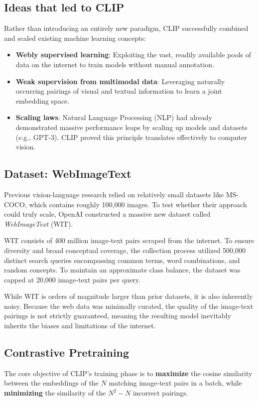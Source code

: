 \subsection{Ideas that led to CLIP}
Rather than introducing an entirely new paradigm, CLIP successfully combined and scaled existing machine learning concepts:
\begin{itemize}
    \item \textbf{Webly supervised learning}: Exploiting the vast, readily available pools of data on the internet to train models without manual annotation.
    \item \textbf{Weak supervision from multimodal data}: Leveraging naturally occurring pairings of visual and textual information to learn a joint embedding space.
    \item \textbf{Scaling laws}: Natural Language Processing (NLP) had already demonstrated massive performance leaps by scaling up models and datasets (e.g., GPT-3). CLIP proved this principle translates effectively to computer vision.
\end{itemize}

\subsection{Dataset: WebImageText}
Previous vision-language research relied on relatively small datasets like MS-COCO, which contains roughly 100,000 images. To test whether their approach could truly scale, OpenAI constructed a massive new dataset called \textit{WebImageText} (WIT).

WIT consists of 400 million image-text pairs scraped from the internet. To ensure diversity and broad conceptual coverage, the collection process utilized 500,000 distinct search queries encompassing common terms, word combinations, and random concepts. To maintain an approximate class balance, the dataset was capped at 20,000 image-text pairs per query.

While WIT is orders of magnitude larger than prior datasets, it is also inherently noisy. Because the web data was minimally curated, the quality of the image-text pairings is not strictly guaranteed, meaning the resulting model inevitably inherits the biases and limitations of the internet.

\subsection{Contrastive Pretraining}
The core objective of CLIP's training phase is to \textbf{maximize} the cosine similarity between the embeddings of the $N$ matching image-text pairs in a batch, while \textbf{minimizing} the similarity of the $N^2 - N$ incorrect pairings.

